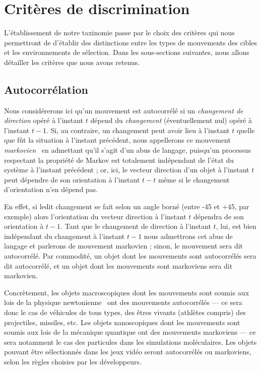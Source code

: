 \section{Critères de discrimination}
    L'établissement de notre taxinomie passe par le choix des critères qui nous permettront de d'établir des distinctions entre les types de mouvements des cibles et les environnements de sélection. Dans les sous-sections suivantes, nous allons détailler les critères que nous avons retenus.

    \subsection{Autocorrélation}
    Nous considérerons ici qu'un mouvement est autocorrélé si un \emph{changement de direction} opéré à l'instant $t$ dépend du \emph{changement} (éventuellement nul) opéré à l'instant $t-1$. Si, au contraire, un changement peut avoir lieu à l'instant $t$ quelle que fût la situation à l'instant précédent, nous appellerons ce mouvement \emph{markovien}~\cite{markov1960theory} en admettant qu'il s'agit d'un abus de langage, puisqu'un processus respectant la propriété de Markov est totalement indépendant de l'état du système à l'instant précédent ; or, ici, le vecteur direction d'un objet à l'instant $t$ peut dépendre de son orientation à l'instant $t-t$ même si le changement d'orientation n'en dépend pas.
    
    En effet, si ledit changement se fait selon un angle borné (entre -45\textdegree{} et +45\textdegree{}, par exemple) alors l'orientation du vecteur direction à l'instant $t$ dépendra de son orientation à $t-1$. Tant que le changement de direction à l'instant $t$, lui, est bien indépendant du changement à l'instant $t-1$ nous admettrons cet abus de langage et parlerons de mouvement markovien ; sinon, le mouvement sera dit autocorrélé. Par commodité, un objet dont les mouvements sont autocorrélés sera dit autocorrélé, et un objet dont les mouvements sont markoviens sera dit markovien.
    
    Concrètement, les objets macroscopiques dont les mouvements sont soumis aux lois de la physique newtonienne~\cite{newton1833philosophiae} ont des mouvements autocorrélés --- ce sera donc le cas de véhicules de tous types, des êtres vivants (athlètes compris) des projectiles, missiles, etc. Les objets nanoscopiques dont les mouvements sont soumis aux lois de la mécanique quantique ont des mouvements markoviens --- ce sera notamment le cas des particules dans les simulations moléculaires. Les objets pouvant être sélectionnés dans les jeux vidéo seront autocorrélés ou markoviens, selon les règles choisies par les développeurs.

